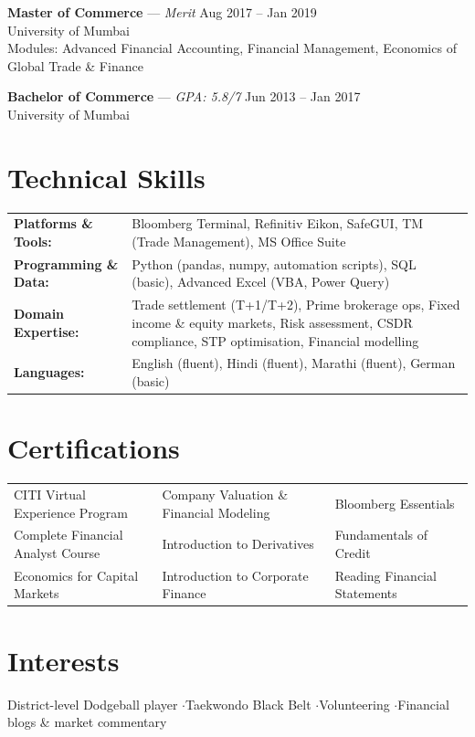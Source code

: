 \documentclass[11pt,a4paper]{article}
\begin{document}
\vspace{4pt}
\textbf{Master of Commerce} --- \textit{Merit} \hfill Aug 2017 -- Jan 2019 \\
University of Mumbai \\
{\small Modules: Advanced Financial Accounting, Financial Management, Economics of Global Trade \& Finance}

\vspace{4pt}
\textbf{Bachelor of Commerce} --- \textit{GPA: 5.8/7} \hfill Jun 2013 -- Jan 2017 \\
University of Mumbai

\section{Technical Skills}

\begin{tabular}{@{}l p{12cm}@{}}
\textbf{Platforms \& Tools:} & Bloomberg Terminal, Refinitiv Eikon, SafeGUI, TM (Trade Management), MS Office Suite \\[3pt]
\textbf{Programming \& Data:} & Python (pandas, numpy, automation scripts), SQL (basic), Advanced Excel (VBA, Power Query) \\[3pt]
\textbf{Domain Expertise:} & Trade settlement (T+1/T+2), Prime brokerage ops, Fixed income \& equity markets, Risk assessment, CSDR compliance, STP optimisation, Financial modelling \\[3pt]
\textbf{Languages:} & English (fluent), Hindi (fluent), Marathi (fluent), German (basic) \\
\end{tabular}

\section{Certifications}

{\small
\begin{tabular}{@{}l l l@{}}
CITI Virtual Experience Program & Company Valuation \& Financial Modeling & Bloomberg Essentials \\
Complete Financial Analyst Course & Introduction to Derivatives & Fundamentals of Credit \\
Economics for Capital Markets & Introduction to Corporate Finance & Reading Financial Statements \\
\end{tabular}
}

\section{Interests}
District-level Dodgeball player \enspace$\cdot$\enspace Taekwondo Black Belt \enspace$\cdot$\enspace Volunteering \enspace$\cdot$\enspace Financial blogs \& market commentary
\end{document}
